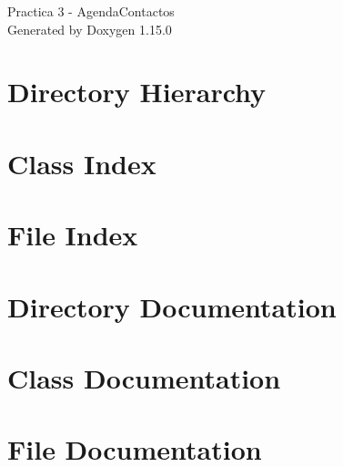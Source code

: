 \documentclass[twoside]{book}
\newcommand{\+}{\discretionary{\mbox{\scriptsize$\hookleftarrow$}}{}{}}
\newcommand{\clearemptydoublepage}{%
    \newpage{\pagestyle{empty}\cleardoublepage}%
  }
\begin{document}
  \raggedbottom
    \hypersetup{pageanchor=false,
                bookmarksnumbered=true,
                pdfencoding=unicode
               }
  \begin{titlepage}
  \vspace*{7cm}
  \begin{center}%
  {\Large Practica 3 -\/ Agenda\+Contactos}\\
  \vspace*{1cm}
  {\large Generated by Doxygen 1.15.0}\\
  \end{center}
  \end{titlepage}
  \clearemptydoublepage
  \tableofcontents
  \clearemptydoublepage
  \hypersetup{pageanchor=true}
\chapter{Directory Hierarchy}

\chapter{Class Index}

\chapter{File Index}

\chapter{Directory Documentation}


\chapter{Class Documentation}


\chapter{File Documentation}










  \backmatter
  \newpage
  \clearemptydoublepage
  \printindex
\end{document}
